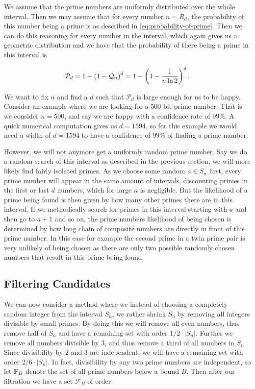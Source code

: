   We assume that the prime numbers are uniformly distributed over the whole interval.
  Then we may assume that for every number $n = R_d$, the probability of this number being a prime is as described in \eqref{eq:probability-of-prime}.
  Then we can do this reasoning for every number in the interval, which again gives us a geometric distribution and we have that the probability of there being a prime in this interval is

  \begin{equation}
    \mathcal{P}_d = 1 - \left(  1-\mathcal{Q}_n  \right)^{d} = 1 - \left(  1-\frac{1}{n \ln 2}  \right)^d.
    \label{eq:probability-of-prime-in-rd}
  \end{equation}

  We want to fix $n$ and find a $d$ such that $\mathcal{P}_d$ is large enough for us to be happy.
  Consider an example where we are looking for a $500$ bit prime number.
  That is we consider $n=500$, and say we are happy with a confidence rate of $99\%$.
  A quick numerical computation gives us $d = 1594$, so for this example we would need a width of $d = 1594$ to have a confidence of $99\%$ of finding a prime number.

  However, we will not anymore get a uniformly random prime number.
  Say we do a random search of this interval as described in the previous section, we will more likely find fairly isolated primes.
  As we choose some random $a \in S_n$ first, every prime number will appear in the same amount of intervals, discounting primes in the first or last $d$ numbers, which for large $n$ is negligible.
  But the likelihood of a prime being found is then given by how many other primes there are in this interval.
  If we methodically search for primes in this interval starting with $a$ and then go to $a+1$ and so on, the prime numbers likelihood of being chosen is determined by how long chain of composite numbers are directly in front of this prime number.
  In this case for example the second prime in a twin prime pair is very unlikely of being chosen as there are only two possible randomly chosen numbers that result in this prime being found.


\subsection{Filtering Candidates}\label{sec:filtering-candidates}

  We can now consider a method where we instead of choosing a completely random integer from the interval $S_n$, we rather shrink $S_n$ by removing all integers divisible by small primes.
  By doing this we will remove all even numbers, thus remove half of $S_n$ and have a remaining set with order $1/2 \cdot |S_n|$.
  Further we remove all numbers divisible by $3$, and thus remove a third of all numbers in $S_n$.
  Since divisibility by $2$ and $3$ are independent, we will have a remaining set with order $2/6 \cdot |S_n|$.
  In fact, divisibility by any two prime numbers are independent, so let $\mathbb{P}_B$ denote the set of all prime numbers below a bound $B$.
  Then after our filtration we have a set $\mathcal{F}_B$ of order

